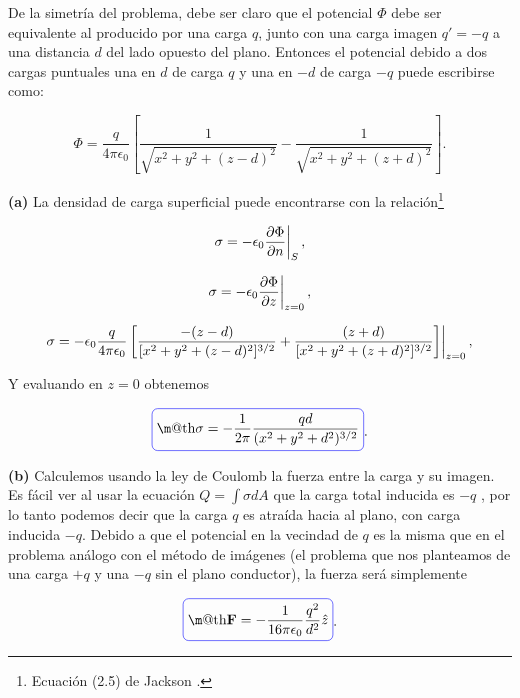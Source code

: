 \documentclass[a4paper,10pt]{article}
\makeatletter
\numberwithin{equation}{section}
\newcommand{\zerodel}{.\kern-\nulldelimiterspace}
\newcommand*{\boxcolor}{blue}
\renewcommand{\boxed}[1]{\textcolor{\boxcolor}{%
\tikz[baseline={([yshift=-1ex]current bounding box.center)}] \node [rectangle, minimum width=1ex,rounded corners,draw] {\normalcolor\m@th$\displaystyle#1$};}}
\makeatother
\begin{document}
De la simetría del problema, debe ser claro que el potencial $\Phi$ debe ser equivalente 
al producido por una carga $q$, junto con una carga imagen $q' = -q$ a una distancia 
$d$ del lado opuesto del plano. Entonces el potencial debido a dos cargas puntuales 
una en $d$ de carga $q$ y una en $-d$ de carga $-q$ puede escribirse como:

\begin{equation}
 \Phi = \frac{q}{4\pi\epsilon_0}\left[\frac{1}{\sqrt{x^2+y^2+(z-d)^2}} 
 - \frac{1}{\sqrt{x^2+y^2+(z+d)^2}} \right].
\end{equation}

\textbf{(a)} La densidad de carga superficial puede encontrarse con la 
relación\footnote{Ecuación (2.5) de Jackson \cite{jackson3}.} 

\begin{equation}
 \left\zerodel \sigma = -\epsilon_0\frac{\partial\Phi}{\partial n}\right|_{S},
\end{equation}

\begin{equation}
 \left\zerodel \sigma = -\epsilon_0\frac{\partial\Phi}{\partial z}\right|_{z=0},
\end{equation}

\begin{equation}
  \left\zerodel \sigma = -\epsilon_0\frac{q}{4\pi\epsilon_0}\left[\frac{-(z-d)}{[x^2+y^2+(z-d)^2]^{3/2}} 
  + \frac{(z+d)}{[x^2+y^2+(z+d)^2]^{3/2}}\right]\right|_{z=0},
\end{equation}

Y evaluando en $z=0$ obtenemos 

\begin{equation}
 \boxed{\sigma = - \frac{1}{2\pi}\frac{qd}{(x^2+y^2+d^2)^{3/2}}}.
\end{equation}

\textbf{(b)} Calculemos usando la ley de Coulomb la fuerza entre la  carga y 
su imagen. Es fácil ver al usar la ecuación $Q = \int \sigma dA$ 
que la carga total inducida es $-q$ \cite{griffiths}, por lo tanto podemos decir que la carga $q$ 
es atraída hacia al plano, con carga inducida $-q$. Debido a que el potencial
en la vecindad de $q$ es la misma que en el problema análogo con el método de 
imágenes (el problema que nos planteamos de una carga $+q$ y una $-q$ sin el plano 
conductor), la fuerza será simplemente 

\begin{equation}
 \boxed{\mathbf{F} = - \frac{1}{16\pi\epsilon_0}\frac{q^2}{d^2}\hat{z}}.
\end{equation}
\end{document}
